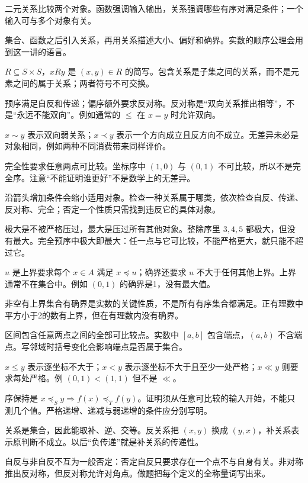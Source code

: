 
二元关系比较两个对象。函数强调输入输出，关系强调哪些有序对满足条件；一个输入可与多个对象有关。

集合、函数之后引入关系，再用关系描述大小、偏好和确界。实数的顺序公理会用到这一讲的语言。

$R\subseteq S\times S$，$xRy$ 是 $(x,y)\in R$ 的简写。包含关系是子集之间的关系，而不是元素之间的属于关系；两者符号不可交换。

预序满足自反和传递；偏序额外要求反对称。反对称是“双向关系推出相等”，不是“永远不能双向”。例如通常的 $\le$ 在 $x=y$ 时允许双向。

$x\sim y$ 表示双向弱关系；$x\prec y$ 表示一个方向成立且反方向不成立。无差异未必是对象相同，例如两种不同消费带来同样评价。

完全性要求任意两点可比较。坐标序中 $(1,0)$ 与 $(0,1)$ 不可比较，所以不是完全序。注意“不能证明谁更好”不是数学上的无差异。

沿箭头增加条件会缩小适用对象。检查一种关系属于哪类，依次检查自反、传递、反对称、完全；否定一个性质只需找到违反它的具体对象。

极大是不被严格压过，最大是压过所有其他对象。整除序里 $3,4,5$ 都极大，但没有最大。完全预序中极大即最大：任一点与它可比较，不能严格更大，就只能不超过它。

$u$ 是上界要求每个 $x\in A$ 满足 $x\preceq u$；确界还要求 $u$ 不大于任何其他上界。上界通常不在集合中。例如 $(0,1)$ 的确界是1，没有最大值。

非空有上界集合有确界是实数的关键性质，不是所有有序集合都满足。正有理数中平方小于2的数有上界，但在有理数内没有确界。

区间包含任意两点之间的全部可比较点。实数中 $[a,b]$ 包含端点，$(a,b)$ 不含端点。写邻域时括号变化会影响端点是否属于集合。

$x\le y$ 表示逐坐标不大于；$x<y$ 表示逐坐标不大于且至少一处严格；$x\ll y$ 则要求每处严格。例 $(0,1)<(1,1)$ 但不是 $\ll$。

序保持是 $x\preceq_S y\Rightarrow f(x)\preceq_T f(y)$。证明须从任意可比较的输入开始，不能只测几个值。严格递增、递减与弱递增的条件应分别写明。

关系是集合，因此能取补、逆、交等。反关系把 $(x,y)$ 换成 $(y,x)$，补关系表示原判断不成立。以后“负传递”就是补关系的传递性。

自反与非自反不互为一般否定：否定自反只要求存在一个点不与自身有关。非对称推出反对称，但反对称允许对角点。做题把每个定义的全称量词写出来。

